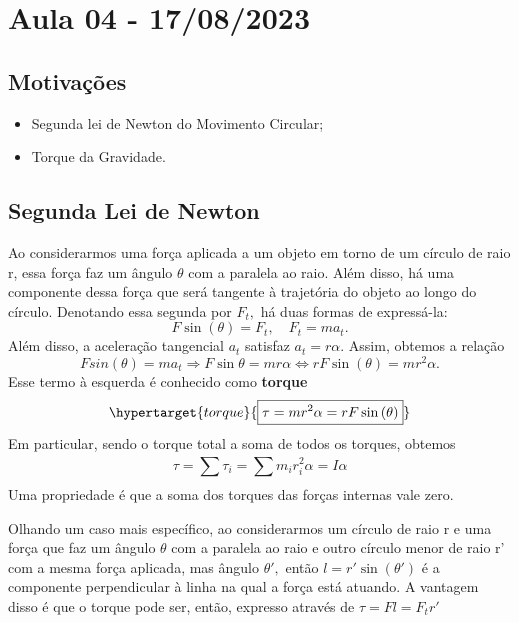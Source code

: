 \documentclass{article}
\begin{document}
\section{Aula 04 - 17/08/2023}
\subsection{Motivações }
\begin{itemize}
  \item Segunda lei de Newton do Movimento Circular;
  \item Torque da Gravidade.
\end{itemize}
\subsection{Segunda Lei de Newton}
Ao considerarmos uma força aplicada a um objeto em torno de um círculo de raio r, essa força faz um ângulo
\(\theta \) com a paralela ao raio. Além disso, há uma componente dessa força que será tangente 
à trajetória do objeto ao longo do círculo. Denotando essa segunda por \(F_{t},\) há duas formas de expressá-la: 
\[
  F\sin{(\theta )} = F_{t},\quad F_{t} = ma_{t}.
\]
Além disso, a aceleração tangencial \(a_{t}\) satisfaz \(a_{t} = r\alpha \). Assim, obtemos a relação 
\[
  F sin(\theta ) = ma_{t} \Rightarrow F\sin{\theta } = mr\alpha \Longleftrightarrow rF\sin{(\theta )} = mr^{2}\alpha.
\]
Esse termo à esquerda é conhecido como \textbf{torque} 
\[
  \hypertarget{torque}{\boxed{\tau = mr^{2}\alpha = rF\sin{(\theta )}}}
\]
Em particular, sendo o torque total a soma de todos os torques, obtemos 
\[
  \tau = \sum\limits_{}^{}\tau_{i} = \sum\limits_{}^{}m_{i}r_{i}^{2}\alpha = I\alpha 
\]
Uma propriedade é que a soma dos torques das forças internas vale zero.

Olhando um caso mais específico, ao considerarmos um círculo de raio r e uma força que
faz um ângulo \(\theta \) com a paralela ao raio e outro círculo menor de raio r' com a mesma força aplicada,
mas ângulo \(\theta ',\) então \(l=r'\sin{(\theta ')}\) é a componente perpendicular à linha na qual a força está atuando.
A vantagem disso é que o torque pode ser, então, expresso através de \(\tau = Fl = F_{t}r'\)
\end{document}
